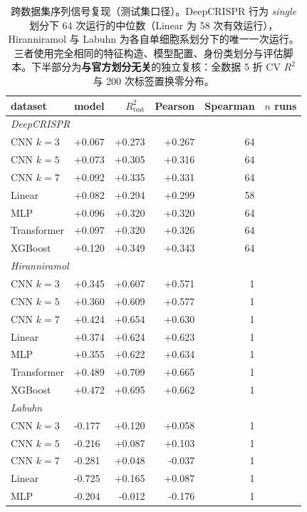 \begin{table}[htbp]
\centering
\scriptsize
\caption{跨数据集序列信号复现（测试集口径）。DeepCRISPR 行为 \emph{single} 划分下 64 次运行的中位数（Linear 为 58 次有效运行），Hiranniramol 与 Labuhn 为各自单细胞系划分下的唯一一次运行。三者使用完全相同的特征构造、模型配置、身份类划分与评估脚本。下半部分为\textbf{与官方划分无关}的独立复核：全数据 5 折 CV $R^{2}$ 与 200 次标签置换零分布。}
\label{tab:replication}
\begin{tabular}{llrrrr}
\toprule
dataset & model & $R^{2}_{\text{test}}$ & Pearson & Spearman & $n$ runs \\
\midrule
\multicolumn{6}{l}{\textit{DeepCRISPR}} \\
CNN $k{=}3$ & +0.067 & +0.273 & +0.267 & 64 \\
CNN $k{=}5$ & +0.073 & +0.305 & +0.316 & 64 \\
CNN $k{=}7$ & +0.092 & +0.335 & +0.331 & 64 \\
Linear & +0.082 & +0.294 & +0.299 & 58 \\
MLP & +0.096 & +0.320 & +0.320 & 64 \\
Transformer & +0.097 & +0.320 & +0.326 & 64 \\
XGBoost & +0.120 & +0.349 & +0.343 & 64 \\
\midrule
\multicolumn{6}{l}{\textit{Hiranniramol}} \\
CNN $k{=}3$ & +0.345 & +0.607 & +0.571 & 1 \\
CNN $k{=}5$ & +0.360 & +0.609 & +0.577 & 1 \\
CNN $k{=}7$ & +0.424 & +0.654 & +0.630 & 1 \\
Linear & +0.374 & +0.624 & +0.623 & 1 \\
MLP & +0.355 & +0.622 & +0.634 & 1 \\
Transformer & +0.489 & +0.709 & +0.665 & 1 \\
XGBoost & +0.472 & +0.695 & +0.662 & 1 \\
\midrule
\multicolumn{6}{l}{\textit{Labuhn}} \\
CNN $k{=}3$ & -0.177 & +0.120 & +0.058 & 1 \\
CNN $k{=}5$ & -0.216 & +0.087 & +0.103 & 1 \\
CNN $k{=}7$ & -0.281 & +0.048 & -0.037 & 1 \\
Linear & -0.725 & +0.165 & +0.087 & 1 \\
MLP & -0.204 & -0.012 & -0.176 & 1 \\

\end{tabular}
\end{table}
